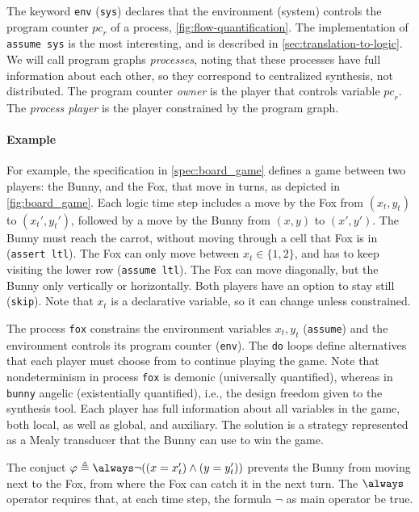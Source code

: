 \documentclass[copyright]{eptcs}
\begin{document}
The keyword \texttt{env} (\texttt{sys}) declares that the environment (system) controls the program counter $\mathit{pc}_r$ of a process, \cref{fig:flow-quantification}.
The implementation of \texttt{assume sys} is the most interesting, and is described in \cref{sec:translation-to-logic}.
We will call program graphs {\em processes}, noting that these processes have full information about each other, so they correspond to centralized synthesis, not distributed.
The program counter {\em owner} is the player that controls variable $\mathit{pc}_r$.
The {\em process player} is the player constrained by the program graph.

\paragraph{Example}

For example, the specification in \cref{spec:board_game} defines a game between two players: the Bunny, and the Fox, that move in turns, as depicted in \cref{fig:board_game}.
Each logic time step includes a move by the Fox from $(x_t, y_t)$ to $(x_t' , y_t')$, followed by a move by the Bunny from $(x, y)$ to $(x', y')$.
The Bunny must reach the carrot, without moving through a cell that Fox is in (\texttt{assert ltl}).
The Fox can only move between $x_t \in \{1, 2\}$, and has to keep visiting the lower row (\texttt{assume ltl}).
The Fox can move diagonally, but the Bunny only vertically or horizontally.
Both players have an option to stay still (\texttt{skip}).
Note that $x_t$ is a declarative variable, so it can change unless constrained.



The process \texttt{fox} constrains the environment variables $x_t, y_t$ (\texttt{assume}) and the environment controls its program counter (\texttt{env}).
The \texttt{do} loops define alternatives that each player must choose from to continue playing the game.
Note that nondeterminism in process \texttt{fox} is demonic (universally quantified), whereas in \texttt{bunny} angelic (existentially quantified), i.e., the design freedom given to the synthesis tool.
Each player has full information about all variables in the game, both local, as well as global, and auxiliary.
The solution is a strategy represented as a Mealy transducer \cite{Mealy55} that the Bunny can use to win the game.

The conjuct
$\varphi \triangleq \always \neg ((x = x_t') \wedge (y = y_t'))$
prevents the Bunny from moving next to the Fox, from where the Fox can catch it in the next turn.
The $\always$ operator requires that, at each time step, the formula $\neg$ as main operator be true.
\end{document}
